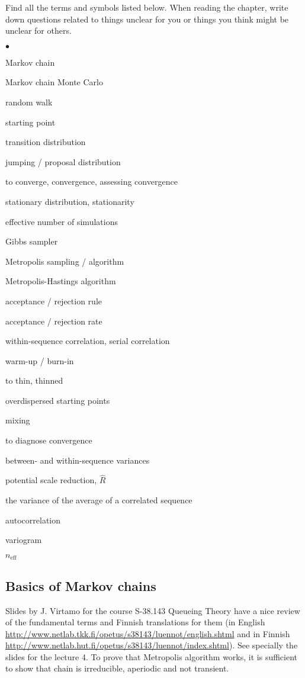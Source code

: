 \documentclass[a4paper,11pt,english]{article}
\begin{document}
Find all the terms and symbols listed below. When reading the chapter,
write down questions related to things unclear for you or things you
think might be unclear for others. 
\begin{list}{$\bullet$}{\parsep=0pt\itemsep=2pt}
\item Markov chain
\item Markov chain Monte Carlo
\item random walk
\item starting point
\item transition distribution
\item jumping / proposal distribution
\item to converge, convergence, assessing convergence
\item stationary distribution, stationarity
\item effective number of simulations
\item Gibbs sampler
\item Metropolis sampling / algorithm
\item Metropolis-Hastings algorithm
\item acceptance / rejection rule
\item acceptance / rejection rate
\item within-sequence correlation, serial correlation
\item warm-up / burn-in
\item to thin, thinned
\item overdispersed starting points
\item mixing
\item to diagnose convergence
\item between- and within-sequence variances
\item potential scale reduction, $\hat{R}$
\item the variance of the average of a correlated sequence
\item autocorrelation
\item variogram
\item $n_{\mathrm{eff}}$
\end{list}

\subsection*{Basics of Markov chains}

Slides by J. Virtamo for the course S-38.143 Queueing Theory have a nice
review of the fundamental terms and Finnish translations for them (in
English
\url{http://www.netlab.tkk.fi/opetus/s38143/luennot/english.shtml} and
in Finnish
\url{http://www.netlab.hut.fi/opetus/s38143/luennot/index.shtml}). See
specially the slides for the lecture 4. To prove that Metropolis
algorithm works, it is sufficient to show that chain is irreducible,
aperiodic and not transient.
\end{document}
